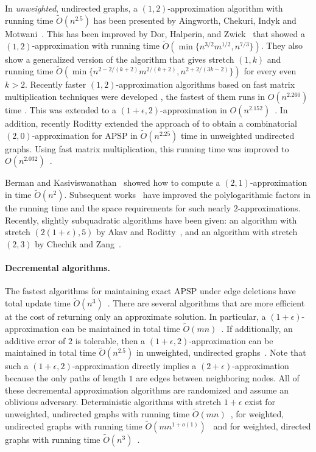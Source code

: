 In \emph{unweighted}, undirected graphs, a $ (1, 2) $-approximation algorithm with running time $ \tilde O (n^{2.5}) $ has been presented by Aingworth, Chekuri, Indyk and Motwani~\cite{AingworthCIM99}. This has been improved by Dor, Halperin, and Zwick~\cite{DHZ00} that showed a $(1,2)$-approximation with running time $\tilde{O}(\min\{n^{3/2}m^{1/2}, n^{7/3} \})$. They also show a generalized version of the algorithm that gives stretch $ (1, k) $ and running time ${\tilde{O}}(\min\{n^{2-{2}/{(k+2)}}m^{{2}/{(k+2)}}, n^{2+{2}/{(3k-2)}}\})$ for every even $k>2$.
Recently faster $(1,2)$-approximation algorithms based on fast matrix multiplication techniques were developed \cite{DengKRWZ22,durr2023improved}, the fastest of them runs in $O(n^{2.260})$ time \cite{durr2023improved}. This was extended to a $(1+\epsilon,2)$-approximation in $O(n^{2.152})$~\cite{DoryFKNVV23}. In addition, recently Roditty \cite{Roditty23} extended the approach of \cite{DHZ00} to obtain a combinatorial $(2,0)$-approximation for APSP in $\tilde{O}(n^{2.25})$ time in unweighted undirected graphs.  Using fast matrix multiplication, this running time was improved to $O(n^{2.032})$~\cite{DoryFKNVV23,saha2024faster}.


Berman and Kasiviswanathan~\cite{BermanK07} showed how to compute a $ (2, 1) $-approximation in time $ \tilde O (n^2) $.
Subsequent works~\cite{BaswanaGS09,BaswanaK10,PatrascuR14,Sommer16,Knudsen17} have improved the polylogarithmic factors in the running time and the space requirements for such nearly $2$-approximations.
Recently, slightly subquadratic algorithms have been given: an algorithm with stretch $ (2 (1 + \epsilon), 5)$ by Akav and Roditty~\cite{AkavR20}, and an algorithm with stretch $(2,3)$ by Chechik and Zang~\cite{ChechikZ22}.




\paragraph{Decremental algorithms.}

The fastest algorithms for maintaining exact APSP under edge deletions have total update time $ \tilde O (n^3) $~\cite{DemetrescuI06,BaswanaHS07,EvaldFGW21}.
There are several algorithms that are more efficient at the cost of returning only an approximate solution.
In particular, a $ (1+\epsilon) $-approximation can be maintained in total time $ \tilde O (m n) $~\cite{RZ12,Bernstein16,KarczmarzL19}.
If additionally, an additive error of $ 2 $ is tolerable, then a $ (1+\epsilon, 2) $-approximation can be maintained in total time $ \tilde O (n^{2.5}) $ in unweighted, undirected graphs~\cite{HKN2016,AbrahamC13}.
Note that such a $ (1+\epsilon, 2) $-approximation directly implies a $ (2 + \epsilon) $-approximation because the only paths of length $ 1 $ are edges between neighboring nodes.
All of these decremental approximation algorithms are randomized and assume an oblivious adversary.
Deterministic algorithms with stretch $ 1 + \epsilon $ exist for unweighted, undirected graphs with running time $ \tilde O (m n) $~\cite{HKN2016}, for weighted, undirected graphs with running time $ \tilde O (m n^{1+o(1)})$~\cite{BernsteinGS21} and for weighted, directed graphs with running time $ \tilde O (n^3) $~\cite{KarczmarzL20}.

